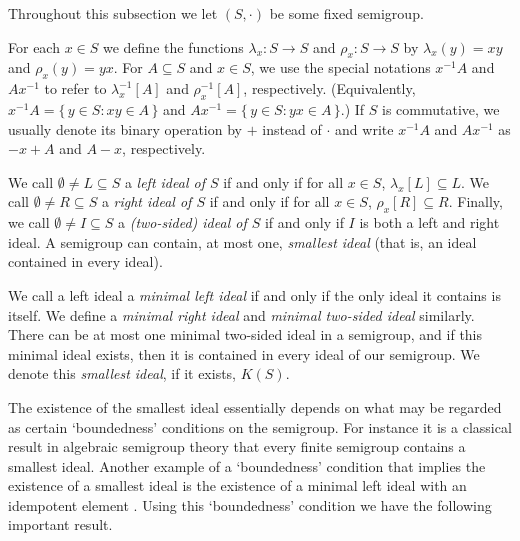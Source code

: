 \documentclass[12pt]{article}
\theoremstyle{plain}
\theoremstyle{definition}
\begin{document}
Throughout this subsection we let $(S, \cdot)$ be some fixed semigroup. 

For each $x \in S$ we define the functions $\lambda_x \colon S \to S$ and $\rho_x \colon S \to S$ by $\lambda_x(y) = xy$ and $\rho_x(y) = yx$. 
For $A \subseteq S$ and $x \in S$, we use the special notations $x^{-1}A$ and $Ax^{-1}$ to refer to $\lambda_x^{-1}[A]$ and $\rho_x^{-1}[A]$, respectively. 
(Equivalently, $x^{-1}A = \{\, y \in S : xy \in A \,\}$ and $Ax^{-1} = \{\, y \in S : yx \in A \,\}$.)
If $S$ is commutative, we usually denote its binary operation by $+$ instead of $\cdot$ and write $x^{-1}A$ and $Ax^{-1}$ as $-x+A$ and $A-x$, respectively. 

We call $\emptyset \ne L \subseteq S$ a \textsl{left ideal of $S$} if and only if for all $x \in S$, $\lambda_x[L] \subseteq L$. 
We call $\emptyset \ne R \subseteq S$ a \textsl{right ideal of $S$} if and only if for all $x \in S$, $\rho_x[R] \subseteq R$. 
Finally, we call $\emptyset \ne I \subseteq S$ a \textsl{(two-sided) ideal of $S$} if and only if $I$ is both a left and right ideal.
A semigroup can contain, at most one, \textsl{smallest ideal} (that is, an ideal contained in every ideal). 

We call a left ideal a \textsl{minimal left ideal} if and only if the only ideal it contains is itself.
We define a \textsl{minimal right ideal} and \textsl{minimal two-sided ideal} similarly.
There can be at most one minimal two-sided ideal in a semigroup, and if this minimal ideal exists, then it is contained in every ideal of our semigroup.
We denote this \textsl{smallest ideal}, if it exists, $K(S)$.%

The existence of the smallest ideal essentially depends on what may be regarded as certain `boundedness' conditions on the semigroup.
For instance it is a classical result in algebraic semigroup theory that every finite semigroup contains a smallest ideal.
Another example of a `boundedness' condition that implies the existence of a smallest ideal is the existence of a minimal left ideal with an idempotent element \cite[Theorem 1.59]{Hindman:1998fk}. 
Using this `boundedness' condition we have the following important result.
\end{document}
